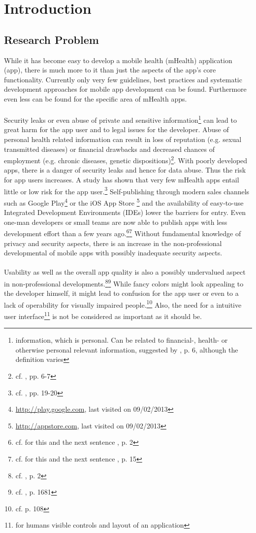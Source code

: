 \section{Introduction}
\subsection{Research Problem}
While it has become easy to develop a mobile health (mHealth) application (app), there is much more to it than just the aspects of the app's core functionality. Currently only very few guidelines, best practices and systematic development approaches for mobile app development can be found. Furthermore even less can be found for the specific area of mHealth apps.
\\
\\
Security leaks or even abuse of private and sensitive information\footnote{information, which is personal. Can be related to financial-, health- or otherwise personal relevant information, suggested by \cite{FutureofPrivacyForumCenterforDemocracy&Technology.2011}, p. 6, although the definition varies} can lead to great harm for the app user and to legal issues for the developer. Abuse of personal health related information can result in loss of reputation (e.g. sexual transmitted diseases) or financial drawbacks and decreased chances of employment (e.g. chronic diseases, genetic dispositions)\footnote{cf. \cite{Dehling.2013}, pp. 6-7}. With poorly developed apps, there is a danger of security leaks and hence for data abuse. Thus the risk for app users increases. A study has shown that very few mHealth apps entail little or low risk for the app user.\footnote{cf. \cite{Njie.2013}, pp. 19-20} Self-publishing through modern sales channels such as Google Play\footnote{\url{http://play.google.com}, last visited on 09/02/2013} or the iOS App Store \footnote{\url{http://appstore.com}, last visited on 09/02/2013} and the availability of easy-to-use Integrated Development Environments (IDEs) lower the barriers for entry. Even one-man developers or small teams are now able to publish apps with less development effort than a few years ago.\footnote{cf. for this and the next sentence \cite{Dehling.2013}, p. 2}\footnote{cf. for this and the next sentence \cite{Moore.2012}, p. 15} Without fundamental knowledge of privacy and security aspects, there is an increase in the non-professional developmental of mobile apps with possibly inadequate security aspects.
\\
\\
Usability as well as the overall app quality is also a possibly undervalued aspect in non-professional developments.\footnote{cf. \cite{Dehling.2013}, p. 2}\footnote{cf. \cite{Mayer.2012}, p. 1681} While fancy colors might look appealing to the developer himself, it might lead to confusion for the app user or even to a lack of operability for visually impaired people.\footnote{cf. \cite{Badashian.2008} p. 108} Also, the need for a intuitive user interface\footnote{for humans visible controls and layout of an application} is not be considered as important as it should be.
